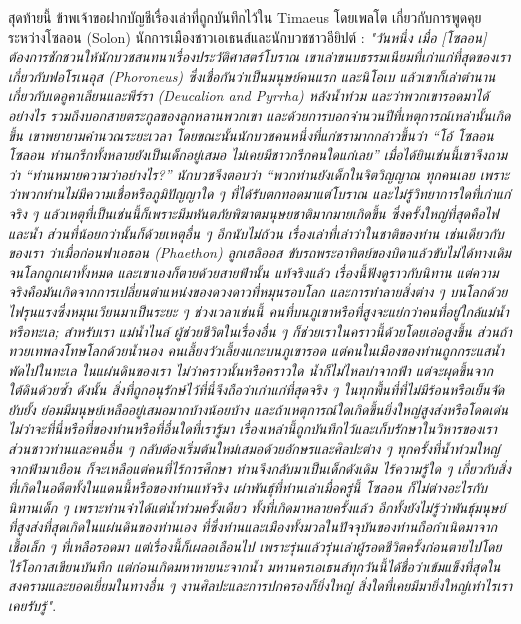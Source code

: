 \documentclass[10pt,twocolumn,letterpaper]{article}
\begin{document}
สุดท้ายนี้ ข้าพเจ้าขอฝากบัญชีเรื่องเล่าที่ถูกบันทึกไว้ใน Timaeus โดยเพลโต เกี่ยวกับการพูดคุยระหว่างโซลอน (Solon) นักการเมืองชาวเอเธนส์และนักบวชชาวอียิปต์ \cite{140}: \textit{"วันหนึ่ง เมื่อ [โซลอน] ต้องการชักชวนให้นักบวชสนทนาเรื่องประวัติศาสตร์โบราณ เขาเล่าขนบธรรมเนียมที่เก่าแก่ที่สุดของเราเกี่ยวกับฟอโรเนอุส (Phoroneus) ซึ่งเชื่อกันว่าเป็นมนุษย์คนแรก และนิโอเบ แล้วเขาก็เล่าตำนานเกี่ยวกับเดอูคาเลียนและพีร์รา (Deucalion and Pyrrha) หลังน้ำท่วม และว่าพวกเขารอดมาได้อย่างไร รวมถึงบอกสายตระกูลของลูกหลานพวกเขา และด้วยการบอกจำนวนปีที่เหตุการณ์เหล่านั้นเกิดขึ้น เขาพยายามคำนวณระยะเวลา โดยขณะนั้นนักบวชคนหนึ่งที่แก่ชรามากกล่าวขึ้นว่า “โอ้ โซลอน โซลอน ท่านกรีกทั้งหลายยังเป็นเด็กอยู่เสมอ ไม่เคยมีชาวกรีกคนใดแก่เลย” เมื่อได้ยินเช่นนี้เขาจึงถามว่า “ท่านหมายความว่าอย่างไร?” นักบวชจึงตอบว่า “พวกท่านยังเด็กในจิตวิญญาณ ทุกคนเลย เพราะว่าพวกท่านไม่มีความเชื่อหรือภูมิปัญญาใด ๆ ที่ได้รับตกทอดมาแต่โบราณ และไม่รู้วิทยาการใดที่เก่าแก่ จริง ๆ แล้วเหตุที่เป็นเช่นนี้ก็เพราะมีมหันตภัยพิฆาตมนุษยชาติมากมายเกิดขึ้น ซึ่งครั้งใหญ่ที่สุดคือไฟและน้ำ ส่วนที่น้อยกว่านั้นก็ด้วยเหตุอื่น ๆ อีกนับไม่ถ้วน เรื่องเล่าที่เล่าว่าในชาติของท่าน เช่นเดียวกับของเรา ว่าเมื่อก่อนฟาเอธอน (Phaethon) ลูกเฮลิออส ขับรถพระอาทิตย์ของบิดาแล้วขับไม่ได้ทางเดิมจนโลกถูกเผาทั้งหมด และเขาเองก็ตายด้วยสายฟ้านั้น แท้จริงแล้ว เรื่องนี้ฟังดูราวกับนิทาน แต่ความจริงคือมันเกิดจากการเปลี่ยนตำแหน่งของดวงดาวที่หมุนรอบโลก และการทำลายสิ่งต่าง ๆ บนโลกด้วยไฟรุนแรงซึ่งหมุนเวียนมาเป็นระยะ ๆ ช่วงเวลาเช่นนี้ คนที่บนภูเขาหรือที่สูงจะแย่กว่าคนที่อยู่ใกล้แม่น้ำหรือทะเล; สำหรับเรา แม่น้ำไนล์ ผู้ช่วยชีวิตในเรื่องอื่น ๆ ก็ช่วยเราในคราวนี้ด้วยโดยเอ่อสูงขึ้น ส่วนถ้าทวยเทพลงโทษโลกด้วยน้ำนอง คนเลี้ยงวัวเลี้ยงแกะบนภูเขารอด แต่คนในเมืองของท่านถูกกระแสน้ำพัดไปในทะเล ในแผ่นดินของเรา ไม่ว่าคราวนั้นหรือคราวใด น้ำก็ไม่ไหลบ่าจากฟ้า แต่จะผุดขึ้นจากใต้ดินด้วยซ้ำ ดังนั้น สิ่งที่ถูกอนุรักษ์ไว้ที่นี่จึงถือว่าเก่าแก่ที่สุดจริง ๆ ในทุกพื้นที่ที่ไม่มีร้อนหรือเย็นจัดยับยั้ง ย่อมมีมนุษย์เหลืออยู่เสมอมากบ้างน้อยบ้าง และถ้าเหตุการณ์ใดเกิดขึ้นยิ่งใหญ่สูงส่งหรือโดดเด่น ไม่ว่าจะที่นี่หรือที่ของท่านหรือที่อื่นใดที่เรารู้มา เรื่องเหล่านี้ถูกบันทึกไว้และเก็บรักษาในวิหารของเรา ส่วนชาวท่านและคนอื่น ๆ กลับต้องเริ่มต้นใหม่เสมอด้วยอักษรและศิลปะต่าง ๆ ทุกครั้งที่น้ำท่วมใหญ่จากฟ้ามาเยือน ก็จะเหลือแต่คนที่ไร้การศึกษา ท่านจึงกลับมาเป็นเด็กดังเดิม ไร้ความรู้ใด ๆ เกี่ยวกับสิ่งที่เกิดในอดีตทั้งในแดนนี้หรือของท่านแท้จริง เผ่าพันธุ์ที่ท่านเล่าเมื่อครู่นี้ โซลอน ก็ไม่ต่างอะไรกับนิทานเด็ก ๆ เพราะท่านจำได้แต่น้ำท่วมครั้งเดียว ทั้งที่เกิดมาหลายครั้งแล้ว อีกทั้งยังไม่รู้ว่าพันธุ์มนุษย์ที่สูงส่งที่สุดเกิดในแผ่นดินของท่านเอง ที่ซึ่งท่านและเมืองทั้งมวลในปัจจุบันของท่านถือกำเนิดมาจากเชื้อเล็ก ๆ ที่เหลือรอดมา แต่เรื่องนี้ก็เผลอเลือนไป เพราะรุ่นแล้วรุ่นเล่าผู้รอดชีวิตครั้งก่อนตายไปโดยไร้โอกาสเขียนบันทึก แต่ก่อนเกิดมหาหายนะจากน้ำ มหานครเอเธนส์ทุกวันนี้ได้ชื่อว่าเข้มแข็งที่สุดในสงครามและยอดเยี่ยมในทางอื่น ๆ งานศิลปะและการปกครองก็ยิ่งใหญ่ สิ่งใดที่เคยมีมายิ่งใหญ่เท่าไรเราเคยรับรู้"}.
\end{document}

